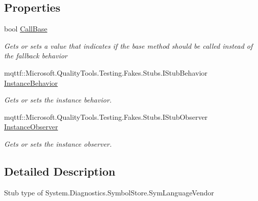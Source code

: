 \subsection*{Properties}
\begin{DoxyCompactItemize}
\item 
bool \hyperlink{class_system_1_1_diagnostics_1_1_symbol_store_1_1_fakes_1_1_stub_sym_language_vendor_ad61a7bb28aba293208a68304bcbe4453}{Call\-Base}
\begin{DoxyCompactList}\small\item\em Gets or sets a value that indicates if the base method should be called instead of the fallback behavior\end{DoxyCompactList}\item 
mqttf\-::\-Microsoft.\-Quality\-Tools.\-Testing.\-Fakes.\-Stubs.\-I\-Stub\-Behavior \hyperlink{class_system_1_1_diagnostics_1_1_symbol_store_1_1_fakes_1_1_stub_sym_language_vendor_ae5e5aa3e8b810fd7ce3056b74cf493a4}{Instance\-Behavior}
\begin{DoxyCompactList}\small\item\em Gets or sets the instance behavior.\end{DoxyCompactList}\item 
mqttf\-::\-Microsoft.\-Quality\-Tools.\-Testing.\-Fakes.\-Stubs.\-I\-Stub\-Observer \hyperlink{class_system_1_1_diagnostics_1_1_symbol_store_1_1_fakes_1_1_stub_sym_language_vendor_ac69c190e7b1c8aa5146e80ba95bf269a}{Instance\-Observer}
\begin{DoxyCompactList}\small\item\em Gets or sets the instance observer.\end{DoxyCompactList}\end{DoxyCompactItemize}


\subsection{Detailed Description}
Stub type of System.\-Diagnostics.\-Symbol\-Store.\-Sym\-Language\-Vendor



